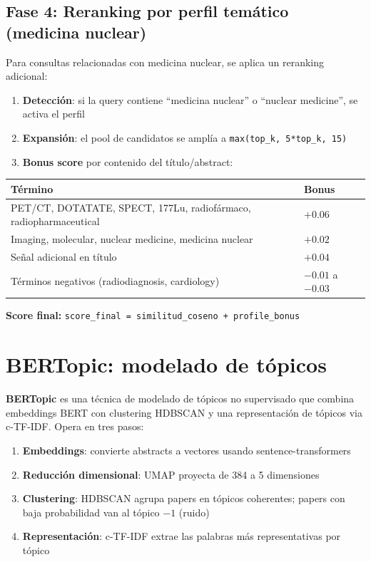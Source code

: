 \documentclass[12pt,a4paper]{report}
\begin{document}
\subsection*{Fase 4: Reranking por perfil temático (medicina nuclear)}

Para consultas relacionadas con medicina nuclear, se aplica un reranking adicional:

\begin{enumerate}
  \item \textbf{Detección}: si la query contiene ``medicina nuclear'' o ``nuclear medicine'', se activa el perfil
  \item \textbf{Expansión}: el pool de candidatos se amplía a \texttt{max(top\_k, 5*top\_k, 15)}
  \item \textbf{Bonus score} por contenido del título/abstract:
\end{enumerate}

\begin{center}
\begin{tabular}{L{7cm}C{3cm}}
  \toprule
  \textbf{Término} & \textbf{Bonus} \\
  \midrule
  PET/CT, DOTATATE, SPECT, 177Lu, radiofármaco, radiopharmaceutical & $+0.06$ \\
  Imaging, molecular, nuclear medicine, medicina nuclear & $+0.02$ \\
  Señal adicional en título & $+0.04$ \\
  Términos negativos (radiodiagnosis, cardiology) & $-0.01$ a $-0.03$ \\
  \bottomrule
\end{tabular}
\end{center}

\textbf{Score final:} \texttt{score\_final = similitud\_coseno + profile\_bonus}

\section{BERTopic: modelado de tópicos}

\textbf{BERTopic} es una técnica de modelado de tópicos no supervisado que combina embeddings BERT con clustering HDBSCAN y una representación de tópicos via c-TF-IDF. Opera en tres pasos:

\begin{enumerate}
  \item \textbf{Embeddings}: convierte abstracts a vectores usando sentence-transformers
  \item \textbf{Reducción dimensional}: UMAP proyecta de 384 a 5 dimensiones
  \item \textbf{Clustering}: HDBSCAN agrupa papers en tópicos coherentes; papers con baja probabilidad van al tópico $-1$ (ruido)
  \item \textbf{Representación}: c-TF-IDF extrae las palabras más representativas por tópico
\end{enumerate}
\end{document}
